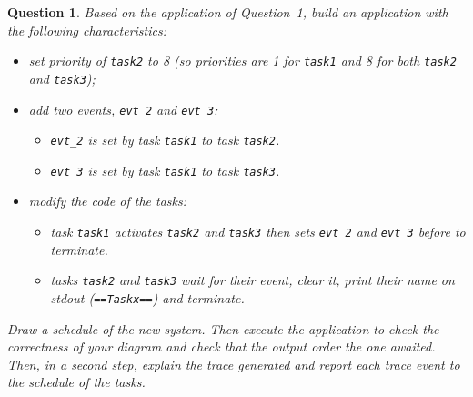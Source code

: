 \documentclass[11pt]{report}
\newtheorem{ex}{Question}
\begin{document}

\begin{ex}
     Based on the application of Question~1, build an application with the following characteristics:
\begin{itemize}
    \item set priority of \texttt{task2} to 8 (so priorities are 1 for \texttt{task1} and 8 for both \texttt{task2} and \texttt{task3});
    \item add two events, \texttt{evt\_2} and \texttt{evt\_3}:
        \begin{itemize}
            \item \texttt{evt\_2} is set by task \texttt{task1} to task \texttt{task2}.
            \item \texttt{evt\_3} is set by task \texttt{task1} to task \texttt{task3}.
        \end{itemize}
    \item modify the code of the tasks:
        \begin{itemize}
            \item task \texttt{task1} activates \texttt{task2} and \texttt{task3} then sets \texttt{evt\_2} and \texttt{evt\_3} before to terminate.
			\item tasks \texttt{task2} and \texttt{task3} wait for their event, clear it, print their name on stdout (\texttt{==Taskx==}) and terminate.
        \end{itemize}
\end{itemize}

Draw a schedule of the new system.
Then execute the application to check the correctness of your diagram and check that the output order the one awaited. Then, in a second step, explain the trace generated and report each trace event to the schedule of the tasks.

\end{ex}
\end{document}
